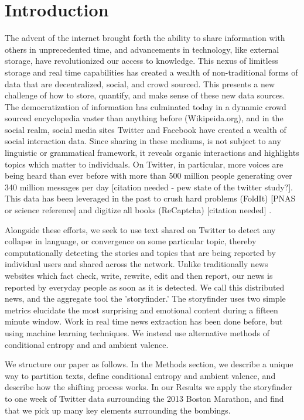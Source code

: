\section{Introduction}

The advent of the internet brought forth the ability to share
information with others in unprecedented time, and advancements in
technology, like external storage, have revolutionized our access to
knowledge. This nexus of limitless storage and real time capabilities
has created a wealth of non-traditional forms of data that are
decentralized, social, and crowd sourced. This presents a new
challenge of how to store, quantify, and make sense of these new data
sources. The democratization of information has culminated today in a
dynamic crowd sourced encyclopedia vaster than anything before
(Wikipeida.org), and in the social realm, social media sites Twitter
and Facebook have created a wealth of social interaction data. Since
sharing in these mediums, is not subject to any linguistic or
grammatical framework, it reveals organic interactions and highlights
topics which matter to individuals. On Twitter, in particular, more
voices are being heard than ever before with more than 500 million
people generating over 340 million messages per day [citation needed -
pew state of the twitter study?]. This data has been leveraged in the
past to crush hard problems (FoldIt) [PNAS or science reference] and
digitize all books (ReCaptcha) [citation needed] .

Alongside these efforts, we seek to use text shared on Twitter to
detect any collapse in language, or convergence on some particular
topic, thereby computationally detecting the stories and topics that
are being reported by individual users and shared across the
network. Unlike traditionally news websites which fact check, write,
rewrite, edit and then report, our news is reported by everyday people
as soon as it is detected. We call this distributed news, and the
aggregate tool the 'storyfinder.' The storyfinder uses two simple
metrics elucidate the most surprising and emotional content during a
fifteen minute window. Work in real time news extraction has been done
before, but using machine learning techniques. We instead use
alternative methods of conditional entropy and and ambient valence.

We structure our paper as follows. In the Methods section, we describe
a unique way to partition texts, define conditional entropy and
ambient valence, and describe how the shifting process works. In our
Results we apply the storyfinder to one week of Twitter data
surrounding the 2013 Boston Marathon, and find that we pick up many
key elements surrounding the bombings.


